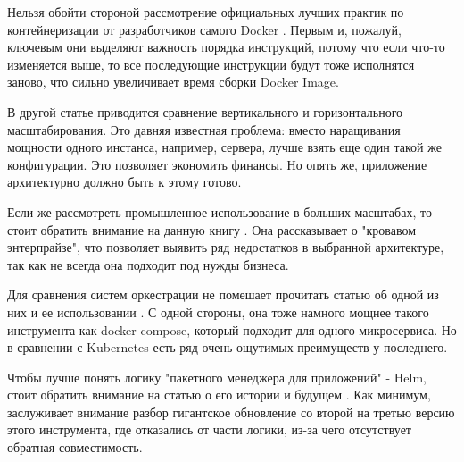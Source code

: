 Нельзя обойти стороной рассмотрение официальных лучших практик по контейнеризации от разработчиков самого Docker \cite{docker:best-practicies}. Первым и, пожалуй, ключевым они выделяют важность порядка инструкций, потому что если что-то изменяется выше, то все последующие инструкции будут тоже исполнятся заново, что сильно увеличивает время сборки Docker Image.

В другой статье \cite{wang2019developing} приводится сравнение вертикального и горизонтального масштабирования. Это давняя известная проблема: вместо наращивания мощности одного инстанса, например, сервера, лучше взять еще один такой же конфигурации. Это позволяет экономить финансы. Но опять же, приложение архитектурно должно быть к этому готово.

Если же рассмотреть промышленное использование в больших масштабах, то стоит обратить внимание на данную книгу \cite{indrasiri2018microservices}. Она рассказывает о "кровавом энтерпрайзе", что позволяет выявить ряд недостатков в выбранной архитектуре, так как не всегда она подходит под нужды бизнеса.

Для сравнения систем оркестрации не помешает прочитать статью об одной из них и ее использовании \cite{naik2016building}. С одной стороны, она тоже намного мощнее такого инструмента как docker-compose, который подходит для одного микросервиса. Но в сравнении с Kubernetes есть ряд очень ощутимых преимуществ у последнего.

Чтобы лучше понять логику "пакетного менеджера для приложений" - Helm, стоит обратить внимание на статью о его истории и будущем \cite{habr:flant:helm}. Как минимум, заслуживает внимание разбор гигантское обновление со второй на третью версию этого инструмента, где отказались от части логики, из-за чего отсутствует обратная совместимость.

